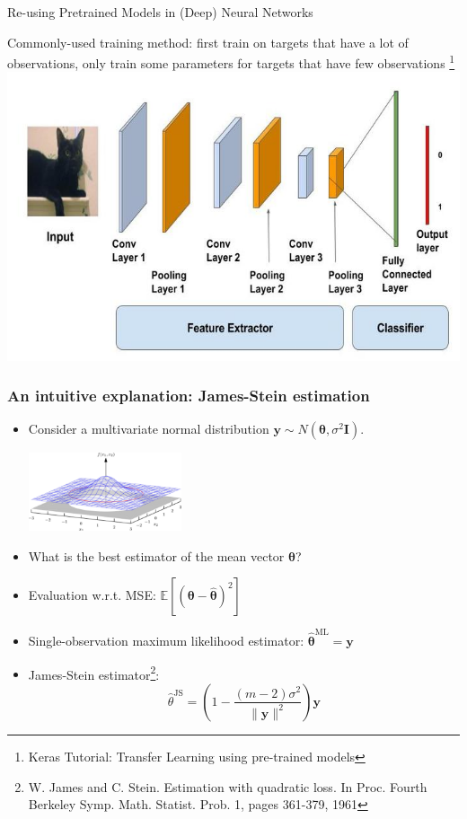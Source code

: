 \documentclass[]{beamer}
\renewcommand{\vec}[1]{\boldsymbol{#1}}
\newcommand{\by}{\boldsymbol{y}}
\begin{document}
\begin{frame}{Re-using Pretrained Models in (Deep) Neural Networks}
\begin{center}
Commonly-used training method: first train on targets that have a lot of observations, only train some parameters for targets that have few observations \footnote{Keras Tutorial: Transfer Learning using pre-trained models } \\
\includegraphics[scale=0.4]{Figures/pretrain2}
\end{center}
\end{frame}

\begin{frame}
\frametitle{An intuitive explanation: James-Stein estimation}

\begin{itemize}
\item Consider a multivariate normal distribution $\by \sim N(\vec{\theta}, \sigma^2\mathbf{I})$.
\begin{center}
\includegraphics[width = 4.5cm]{Figures/biva}
\end{center}
\item What is the best estimator of the mean vector $\vec{\theta}$?
\item Evaluation w.r.t. MSE: $\mathbb{E}[(\vec\theta - \hat{\vec\theta})^2]$
\item Single-observation maximum likelihood estimator: $\hat{\vec\theta}^{\mathrm{ML}} = \by$
\item James-Stein estimator\footnote{W. James and C. Stein. Estimation with quadratic loss. In Proc. Fourth Berkeley Symp. Math.
Statist. Prob. 1, pages 361-379, 1961}: 
$$
\hat{\theta}^{\mathrm{JS}} = \left (1 - \frac{(m-2)\sigma^2}{\|\by\|^2} \right )\by
$$
\end{itemize}

\end{frame}
\end{document}
